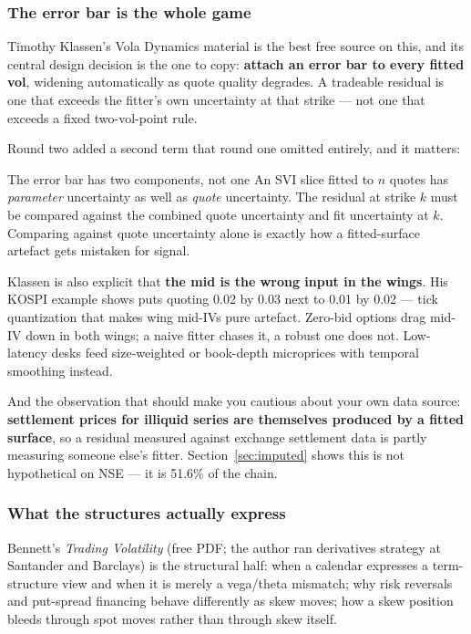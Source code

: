 \documentclass[11pt,a4paper]{article}
\begin{document}
\subsubsection{The error bar is the whole game}

Timothy Klassen's Vola Dynamics material is the best free source on this, and its
central design decision is the one to copy: \textbf{attach an error bar to every
fitted vol}, widening automatically as quote quality degrades. A tradeable
residual is one that exceeds the fitter's own uncertainty at that strike --- not
one that exceeds a fixed two-vol-point rule.

Round two added a second term that round one omitted entirely, and it matters:

\begin{keyfact}{The error bar has two components, not one}
An SVI slice fitted to $n$ quotes has \emph{parameter} uncertainty as well as
\emph{quote} uncertainty. The residual at strike $k$ must be compared against the
combined quote uncertainty and fit uncertainty at $k$. Comparing against quote
uncertainty alone is exactly how a fitted-surface artefact gets mistaken for
signal.
\end{keyfact}

Klassen is also explicit that \textbf{the mid is the wrong input in the wings}.
His KOSPI example shows puts quoting 0.02 by 0.03 next to 0.01 by 0.02 --- tick
quantization that makes wing mid-IVs pure artefact. Zero-bid options drag mid-IV
down in both wings; a naive fitter chases it, a robust one does not. Low-latency
desks feed size-weighted or book-depth microprices with temporal smoothing instead.

And the observation that should make you cautious about your own data source:
\textbf{settlement prices for illiquid series are themselves produced by a fitted
surface}, so a residual measured against exchange settlement data is partly
measuring someone else's fitter. Section~\ref{sec:imputed} shows this is not
hypothetical on NSE --- it is 51.6\% of the chain.

\subsubsection{What the structures actually express}

Bennett's \emph{Trading Volatility} (free PDF; the author ran derivatives
strategy at Santander and Barclays) is the structural half: when a calendar
expresses a term-structure view and when it is merely a vega/theta mismatch; why
risk reversals and put-spread financing behave differently as skew moves; how a
skew position bleeds through spot moves rather than through skew itself.
\end{document}
